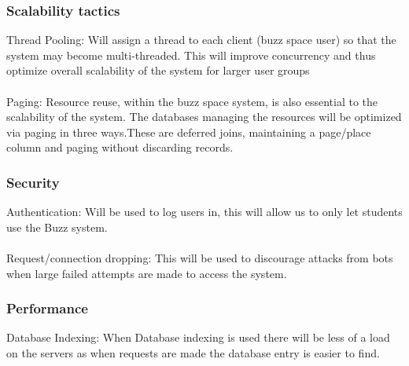 \subsubsection{Scalability tactics}
Thread Pooling: Will assign a thread to each client (buzz space user) so that the system may become multi-threaded. This will improve concurrency and thus optimize overall scalability of the system for larger user groups\\
\\  
Paging: Resource reuse, within the buzz space system, is also essential to the scalability of the system. The databases managing the resources will be optimized via paging in three ways.These are deferred joins, maintaining a page/place column and paging without discarding records.\\
\subsubsection{Security}  
Authentication: Will be used to log users in, this will allow us to only let students use the Buzz system.\\
\\
Request/connection dropping: This will be used to discourage attacks from bots when large failed attempts are made to access the system.\\
\subsubsection{Performance}
Database Indexing: When Database indexing is used there will be less of a load on the servers as when requests are made the database entry is easier to find.